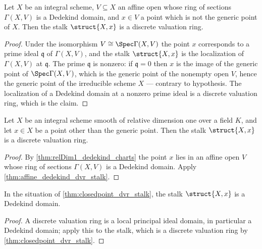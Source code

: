 \begin{theorem}
  \label{thm:affine_dedekind_dvr_stalk}
  \leanok
  Let \(X\) be an integral scheme, \(V \subseteq X\) an affine open whose ring of sections
  \(\Gamma(X, V)\) is a Dedekind domain, and \(x \in V\) a point which is not the generic point
  of \(X\). Then the stalk \(\struct{X,x}\) is a discrete valuation ring.
\end{theorem}
\begin{proof}
  \leanok
  Under the isomorphism \(V \cong \Spec \Gamma(X, V)\) the point \(x\) corresponds to a prime
  ideal \(\mathfrak q\) of \(\Gamma(X, V)\), and the stalk \(\struct{X,x}\) is the localization
  of \(\Gamma(X, V)\) at \(\mathfrak q\). The prime \(\mathfrak q\) is nonzero: if
  \(\mathfrak q = 0\) then \(x\) is the image of the generic point of \(\Spec \Gamma(X, V)\),
  which is the generic point of the nonempty open \(V\), hence the generic point of the
  irreducible scheme \(X\) --- contrary to hypothesis. The localization of a Dedekind domain at
  a nonzero prime ideal is a discrete valuation ring, which is the claim.
\end{proof}

\begin{theorem}
  \label{thm:closedpoint_dvr_stalk}
  \leanok
  Let \(X\) be an integral scheme smooth of relative dimension one over a field \(K\), and let
  \(x \in X\) be a point other than the generic point. Then the stalk \(\struct{X,x}\) is a
  discrete valuation ring.
\end{theorem}
\begin{proof}
  \leanok
  By \ref{thm:relDim1_dedekind_charts} the point \(x\) lies in an affine open \(V\) whose ring
  of sections \(\Gamma(X, V)\) is a Dedekind domain. Apply \ref{thm:affine_dedekind_dvr_stalk}.
\end{proof}

\begin{theorem}
  \label{thm:closedpoint_dedekind_stalk}
  \leanok
  In the situation of \ref{thm:closedpoint_dvr_stalk}, the stalk \(\struct{X,x}\) is a Dedekind
  domain.
\end{theorem}
\begin{proof}
  \leanok
  A discrete valuation ring is a local principal ideal domain, in particular a Dedekind domain;
  apply this to the stalk, which is a discrete valuation ring by \ref{thm:closedpoint_dvr_stalk}.
\end{proof}

